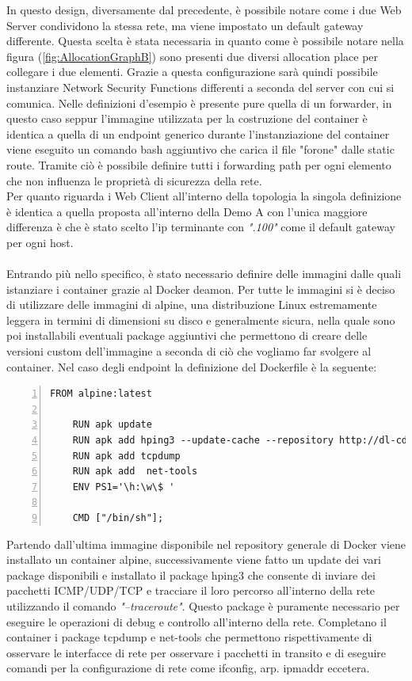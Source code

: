 In questo design, diversamente dal precedente, è possibile notare come i due Web Server condividono la stessa rete, ma viene impostato un default gateway differente. Questa scelta è stata necessaria in quanto 
come è possibile notare nella figura (\ref{fig:AllocationGraphB}) sono presenti due diversi allocation place per collegare i due elementi. Grazie a questa configurazione sarà quindi possibile instanziare Network Security Functions
differenti a seconda del server con cui si comunica. Nelle definizioni d'esempio è presente pure quella di un forwarder, in questo caso seppur l'immagine utilizzata per la costruzione del container è identica a quella di un endpoint generico
durante l'instanziazione del container viene eseguito un comando bash aggiuntivo che carica il file "forone" dalle static route. Tramite ciò è possibile definire tutti i forwarding path per ogni elemento che non influenza le proprietà di sicurezza della rete.\\
Per quanto riguarda i Web Client all'interno della topologia la singola definizione è identica a quella proposta all'interno della Demo A con l'unica maggiore differenza è che è stato scelto l'ip terminante con \textit{".100"} come il default gateway per ogni 
host.\\ \\ 
Entrando più nello specifico, è stato necessario definire delle immagini dalle quali istanziare i container grazie al Docker deamon. Per tutte le immagini si è deciso di utilizzare delle immagini di alpine, una distribuzione Linux estremamente leggera in termini di dimensioni su disco e generalmente sicura, nella quale sono poi installabili eventuali
package aggiuntivi che permettono di creare delle versioni custom dell'immagine a seconda di ciò che vogliamo far svolgere al container. Nel caso degli endpoint la definizione del Dockerfile è la seguente:


\begin{lstlisting}[style=bashstyle, caption={Definizione Dockerfile Endpoint}, label=lst:bash-dockerfileEnd,numbers=left]
    FROM alpine:latest

    RUN apk update
    RUN apk add hping3 --update-cache --repository http://dl-cdn.alpinelinux.org/alpine/edge/testing
    RUN apk add tcpdump
    RUN apk add  net-tools 
    ENV PS1='\h:\w\$ '
    
    CMD ["/bin/sh"];
\end{lstlisting}

Partendo dall'ultima immagine disponibile nel repository generale di Docker viene installato un container alpine, successivamente viene fatto un update dei vari package disponibili e installato il package hping3 che consente di inviare dei pacchetti ICMP/UDP/TCP
e tracciare il loro percorso all'interno della rete utilizzando il comando \textit{"--traceroute"}. Questo package è  puramente necessario per eseguire le operazioni di debug e controllo all'interno della rete. Completano il container i package tcpdump e net-tools
che permettono rispettivamente di osservare le interfacce di rete per osservare i pacchetti in transito e di eseguire comandi per la configurazione di rete come ifconfig, arp. ipmaddr eccetera.\\

